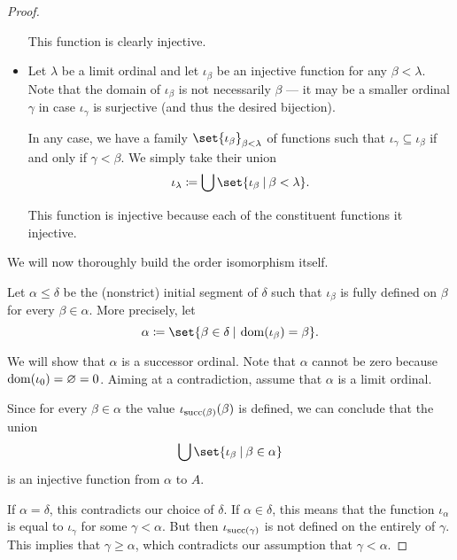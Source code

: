 \begin{proof}
\begin{itemize}
    This function is clearly injective.

    \item Let \( \lambda \) be a limit ordinal and let \( \iota_\beta \) be an injective function for any \( \beta < \lambda \). Note that the domain of \( \iota_\beta \) is not necessarily \( \beta \) --- it may be a smaller ordinal \( \gamma \) in case \( \iota_\gamma \) is surjective (and thus the desired bijection).

    In any case, we have a family \( \set{ \iota_\beta }_{\beta < \lambda} \) of functions such that \( \iota_\gamma \subseteq \iota_\beta \) if and only if \( \gamma < \beta \). We simply take their union
    \begin{equation*}
      \iota_\lambda \coloneqq \bigcup \set{ \iota_\beta \given \beta < \lambda }.
    \end{equation*}

    This function is injective because each of the constituent functions it injective.
  \end{itemize}

  We will now thoroughly build the order isomorphism itself.

  Let \( \alpha \leq \delta \) be the (nonstrict) initial segment of \( \delta \) such that \( \iota_\beta \) is fully defined on \( \beta \) for every \( \beta \in \alpha \). More precisely, let
  \begin{equation*}
    \alpha \coloneqq \set{ \beta \in \delta \given \dom(\iota_\beta) = \beta }.
  \end{equation*}

  We will show that \( \alpha \) is a successor ordinal. Note that \( \alpha \) cannot be zero because \( \operatorname{dom}(\iota_0) = \varnothing = 0 \). Aiming at a contradiction, assume that \( \alpha \) is a limit ordinal.

  Since for every \( \beta \in \alpha \) the value \( \iota_{\operatorname{succ}(\beta)}(\beta) \) is defined, we can conclude that the union
  \begin{equation*}
    \bigcup\set{ \iota_\beta \given \beta \in \alpha }
  \end{equation*}
  is an injective function from \( \alpha \) to \( A \).

  If \( \alpha = \delta \), this contradicts our choice of \( \delta \). If \( \alpha \in \delta \), this means that the function \( \iota_\alpha \) is equal to \( \iota_\gamma \) for some \( \gamma < \alpha \). But then \( \iota_{\operatorname{succ}(\gamma)} \) is not defined on the entirely of \( \gamma \). This implies that \( \gamma \geq \alpha \), which contradicts our assumption that \( \gamma < \alpha \).


\end{proof}
